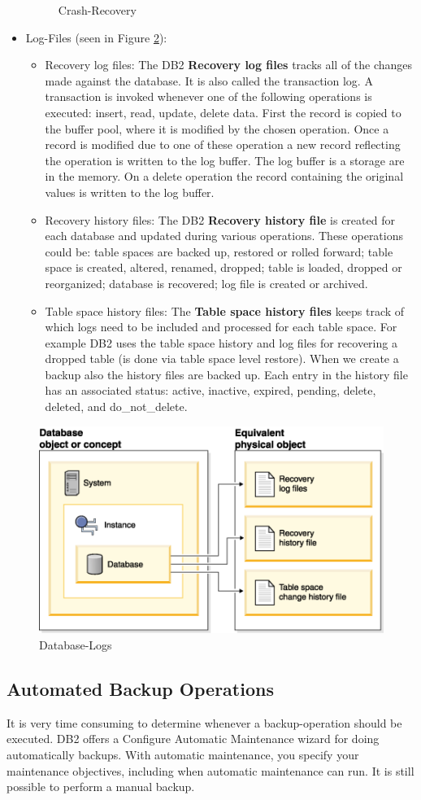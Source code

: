 \documentclass{vldb}
\begin{document}
\begin{itemize}
\begin{figure}[H]
	\caption{Crash-Recovery}
	\label{fig:crecovery}
\end{figure}
\item Log-Files (seen in Figure \ref{fig:dbfiles}):
\begin{itemize}
\item Recovery log files: The DB2 \textbf{Recovery log files} tracks all of the changes made against the database. It is also called the transaction log. A transaction is invoked whenever one of the following operations is executed: insert, read, update, delete data. First the record is copied to the buffer pool, where it is modified by the chosen operation. Once a record is modified due to one of these operation a new record reflecting the operation is written to the log buffer. The log buffer is a storage are in the memory. On a delete operation the record containing the original values is written to the log buffer. 
\item Recovery history files: The DB2 \textbf{Recovery history file} is created for each database and updated during various operations. These operations could be: table spaces are backed up, restored or rolled forward; table space is created, altered, renamed, dropped; table is loaded, dropped or reorganized; database is recovered; log file is created or archived.
\item Table space history files: The \textbf{Table space history files} keeps track of which logs need to be included and processed for each table space. For example DB2 uses the table space history and log files for recovering a dropped table (is done via table space level restore). When we create a backup also the history files are backed up. Each entry in the history file has an associated status: active, inactive, expired, pending, delete, deleted, and do\_not\_delete.
\end{itemize}
\end{itemize}

\begin{figure}[H]
	\centering
	\includegraphics[width=.38\textwidth]{db-files.png}
	\caption{Database-Logs}
	\label{fig:dbfiles}
\end{figure}

\subsection{Automated Backup Operations}
It is very time consuming to determine whenever a backup-operation should be executed. DB2 offers a Configure Automatic Maintenance wizard for doing automatically backups. With automatic maintenance, you specify your maintenance objectives, including when automatic maintenance can run. It is still possible to perform a manual backup. 
\end{document}

